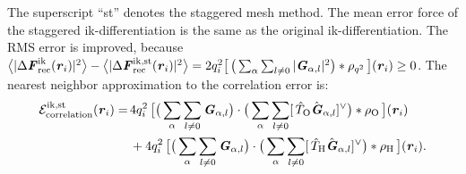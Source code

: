 \documentclass[aps,pre,preprint]{revtex4}
\renewcommand{\v}[1]{\textbf{\textit{#1}}}
\begin{document}
The superscript ``st'' denotes the staggered mesh method.
The mean error force of the staggered ik-differentiation is the
same as the original ik-differentiation.
The RMS error is improved, because
$\big\langle\vert\Delta\v F_{\textrm{rec}}^{\textrm{ik}}(\v r_i)\vert^2\big\rangle -
\big\langle\vert\Delta\v F_{\textrm{rec}}^{\textrm{ik,st}}(\v r_i)\vert^2\big\rangle=
2q_i^2
\big[\,
\big(
\sum_{\alpha} \sum_{l\neq 0}
\vert \v G_{\alpha,l}\vert^2
\big)
\ast \rho_{q^2}
\,\big] (\v r_i) \geq 0$.
The nearest neighbor approximation to the correlation error is:
\begin{align}\nonumber
  \mathcal E^{\textrm{ik,st}}_{\textrm{correlation}}(\v r_i)
  =\,&
  4q_i^2\,
  \big[
  \big(
  \sum_{\alpha} \sum_{l\neq 0}  
  \v G_{\alpha,l}
  \big)
  \cdot
  \big(
  \sum_{\alpha} \sum_{l\neq 0}  
  [\,\hat T_{\textrm{O}}\hat{\v G}_{\alpha,l}]^{\vee}
  \big)
  \ast \rho_{\textrm{O}}\,
  \big] (\v r_i) \\\nonumber
  \,&+
  4q_i^2\,
  \big[
  \big(
  \sum_{\alpha} \sum_{l\neq 0}  
  \v G_{\alpha,l}
  \big)
  \cdot
  \big(
  \sum_{\alpha} \sum_{l\neq 0}  
  [\,\hat T_{\textrm{H}}\hat{\v G}_{\alpha,l}]^{\vee}
  \big)
  \ast \rho_{\textrm{H}}\,
  \big] (\v r_i).
\end{align}
\end{document}
